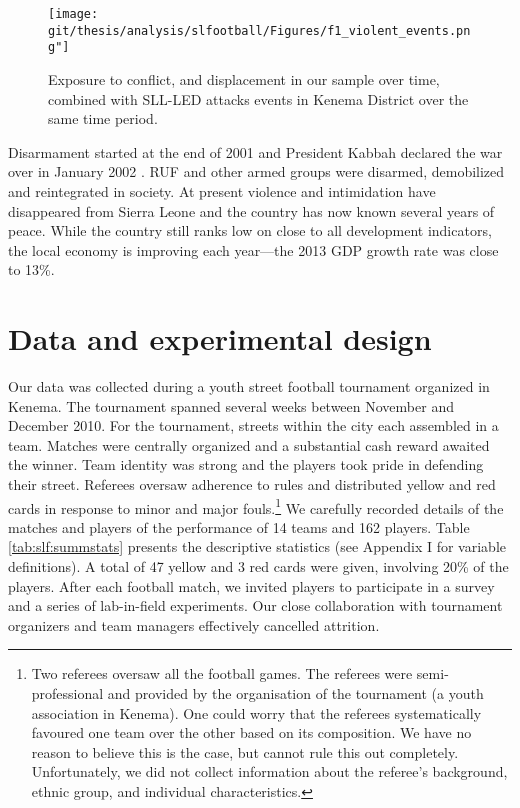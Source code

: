 \begin{figure}[htb]
  \texttt{[image: \\git/thesis/analysis/slfootball/Figures/f1\_violent\_events.png"]}
  \caption{Exposure to conflict, and displacement in our sample over time, combined with SLL-LED attacks events in Kenema District over the same time period.}
  \label{fig:slf:conflictexposure}
\end{figure}

Disarmament started at the end of 2001 and President Kabbah declared the war over in January 2002 \cite{Peters2011}. RUF and other armed groups were disarmed, demobilized and reintegrated in society. At present violence and intimidation have disappeared from Sierra Leone and the country has now known several years of peace. While the country still ranks low on close to all development indicators, the local economy is improving each year––the 2013 GDP growth rate was close to 13\%.

\section{Data and experimental design}
\label{sec:slf:data}
Our data was collected during a youth street football tournament organized in Kenema. The tournament spanned several weeks between November and December 2010. For the tournament, streets within the city each assembled in a team. Matches were centrally organized and a substantial cash reward awaited the winner. Team identity was strong and the players took pride in defending their street. Referees oversaw adherence to rules and distributed yellow and red cards in response to minor and major fouls.\footnote{Two referees oversaw all the football games. The referees were semi-professional and provided by the organisation of the tournament (a youth association in Kenema). One could worry that the referees systematically favoured one team over the other based on its composition. We have no reason to believe this is the case, but cannot rule this out completely. Unfortunately, we did not collect information about the referee’s background, ethnic group, and individual characteristics.}  We carefully recorded details of the matches and players of the performance of 14 teams and 162 players.  Table \ref{tab:slf:summstats} presents the descriptive statistics (see Appendix I for variable definitions). A total of 47 yellow and 3 red cards were given, involving 20\% of the players. After each football match, we invited players to participate in a survey and a series of lab-in-field experiments. Our close collaboration with tournament organizers and team managers effectively cancelled attrition. 

